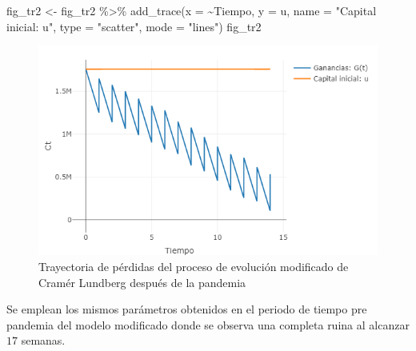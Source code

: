 \documentclass[
  us-letterpaper,
]{scrreprt}
\newenvironment{Shaded}{\begin{snugshade}}{\end{snugshade}}
\newcommand{\AttributeTok}[1]{\textcolor[rgb]{0.40,0.45,0.13}{#1}}
\newcommand{\FunctionTok}[1]{\textcolor[rgb]{0.28,0.35,0.67}{#1}}
\newcommand{\NormalTok}[1]{\textcolor[rgb]{0.00,0.23,0.31}{#1}}
\newcommand{\OtherTok}[1]{\textcolor[rgb]{0.00,0.23,0.31}{#1}}
\newcommand{\SpecialCharTok}[1]{\textcolor[rgb]{0.37,0.37,0.37}{#1}}
\newcommand{\StringTok}[1]{\textcolor[rgb]{0.13,0.47,0.30}{#1}}
\theoremstyle{plain}
\theoremstyle{plain}
\theoremstyle{definition}
\theoremstyle{remark}
\begin{document}
\begin{Shaded}
\begin{Highlighting}[]
\NormalTok{fig\_tr2 }\OtherTok{\textless{}{-}}\NormalTok{ fig\_tr2 }\SpecialCharTok{\%\textgreater{}\%} \FunctionTok{add\_trace}\NormalTok{(}\AttributeTok{x =} \SpecialCharTok{\textasciitilde{}}\NormalTok{Tiempo, }\AttributeTok{y =}\NormalTok{ u,}
        \AttributeTok{name =} \StringTok{"Capital inicial: u"}\NormalTok{, }
        \AttributeTok{type =} \StringTok{"scatter"}\NormalTok{, }\AttributeTok{mode =} \StringTok{"lines"}\NormalTok{)}
\NormalTok{fig\_tr2}
\end{Highlighting}
\end{Shaded}

\begin{figure}

\includegraphics[width=6.25in,height=\textheight]{trayectoria2pdf.png}

\caption{\label{fig-fig-trayectoria2pdf}Trayectoria de pérdidas del
proceso de evolución modificado de Cramér Lundberg después de la
pandemia}

\end{figure}%

Se emplean los mismos parámetros obtenidos en el periodo de tiempo pre
pandemia del modelo modificado donde se observa una completa ruina al
alcanzar \(17\) semanas.
\end{document}

